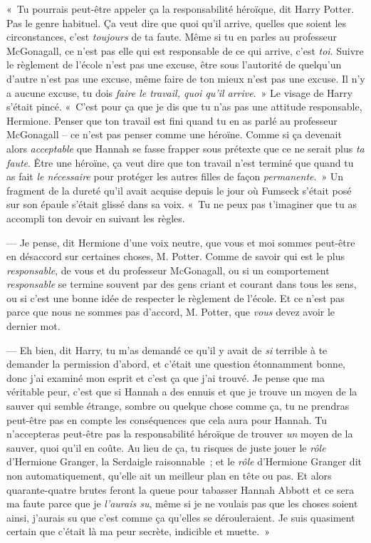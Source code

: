 «~Tu pourrais peut-être appeler ça la responsabilité héroïque, dit Harry Potter. Pas le genre habituel. Ça veut dire que quoi qu'il arrive, quelles que soient les circonstances, c'est \emph{toujours} de ta faute. Même si tu en parles au professeur McGonagall, ce n'est pas elle qui est responsable de ce qui arrive, c'est \emph{toi}. Suivre le règlement de l'école n'est pas une excuse, être sous l'autorité de quelqu'un d'autre n'est pas une excuse, même faire de ton mieux n'est pas une excuse. Il n'y a aucune excuse, tu dois \emph{faire le travail, quoi qu'il arrive}.~» Le visage de Harry s'était pincé. «~C'est pour ça que je dis que tu n'as pas une attitude responsable, Hermione. Penser que ton travail est fini quand tu en as parlé au professeur McGonagall -- ce n'est pas penser comme une héroïne. Comme si ça devenait alors \emph{acceptable} que Hannah se fasse frapper sous prétexte que ce ne serait plus \emph{ta faute}. Être une héroïne, ça veut dire que ton travail n'est terminé que quand tu as fait \emph{le nécessaire} pour protéger les autres filles de façon \emph{permanente}.~» Un fragment de la dureté qu'il avait acquise depuis le jour où Fumseck s'était posé sur son épaule s'était glissé dans sa voix. «~Tu ne peux pas t'imaginer que tu as accompli ton devoir en suivant les règles.

--- Je pense, dit Hermione d'une voix neutre, que vous et moi sommes peut-être en désaccord sur certaines choses, M. Potter. Comme de savoir qui est le plus \emph{responsable}, de vous et du professeur McGonagall, ou si un comportement \emph{responsable} se termine souvent par des gens criant et courant dans tous les sens, ou si c'est une bonne idée de respecter le règlement de l'école. Et ce n'est pas parce que nous ne sommes pas d'accord, M. Potter, que \emph{vous} devez avoir le dernier mot.

--- Eh bien, dit Harry, tu m'as demandé ce qu'il y avait de \emph{si} terrible à te demander la permission d'abord, et c'était une question étonnamment bonne, donc j'ai examiné mon esprit et c'est ça que j'ai trouvé. Je pense que ma véritable peur, c'est que si Hannah a des ennuis et que je trouve un moyen de la sauver qui semble étrange, sombre ou quelque chose comme ça, tu ne prendras peut-être pas en compte les conséquences que cela aura pour Hannah. Tu n'accepteras peut-être pas la responsabilité héroïque de trouver \emph{un} moyen de la sauver, quoi qu'il en coûte. Au lieu de ça, tu risques de juste jouer le \emph{rôle} d'Hermione Granger, la Serdaigle raisonnable~; et le \emph{rôle} d'Hermione Granger dit non automatiquement, qu'elle ait un meilleur plan en tête ou pas. Et alors quarante-quatre brutes feront la queue pour tabasser Hannah Abbott et ce sera ma faute parce que je \emph{l'aurais su}, même si je ne voulais pas que les choses soient ainsi, j'aurais su que c'est comme ça qu'elles se dérouleraient. Je suis quasiment certain que c'était là ma peur secrète, indicible et muette.~»

